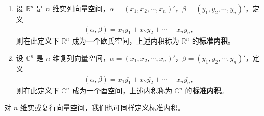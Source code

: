 \documentclass[../../main.tex]{subfiles}%
\begin{document}
\begin{definition}[标准内积]
\begin{enumerate}
\item 设 \(\mathbb{R}^n\) 是 \(n\) 维实列向量空间，\(\alpha=(x_1,x_2,\cdots,x_n)'\)，\(\beta=(y_1,y_2,\cdots,y_n)'\)，定义
\begin{align*}
(\alpha,\beta)=x_1y_1 + x_2y_2+\cdots + x_ny_n,
\end{align*}
则在此定义下 \(\mathbb{R}^n\) 成为一个欧氏空间，上述内积称为 \(\mathbb{R}^n\) 的\textbf{标准内积}。

\item 设 \(\mathbb{C}^n\) 是 \(n\) 维复列向量空间，\(\alpha=(x_1,x_2,\cdots,x_n)'\)，\(\beta=(y_1,y_2,\cdots,y_n)'\)，定义
\begin{align*}
(\alpha,\beta)=x_1\overline{y_1}+x_2\overline{y_2}+\cdots + x_n\overline{y_n},
\end{align*}
则在此定义下 \(\mathbb{C}^n\) 成为一个酉空间，上述内积称为 \(\mathbb{C}^n\) 的\textbf{标准内积}。
\end{enumerate}
\end{definition}
\begin{remark}
对 \(n\) 维实或复行向量空间，我们也可同样定义标准内积。 
\end{remark}
\end{document}

